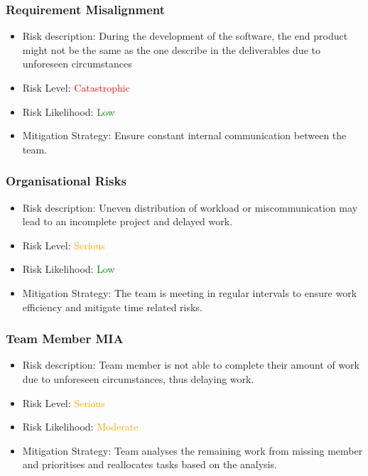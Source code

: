 \documentclass{article}
\begin{document}
\subsubsection{Requirement Misalignment}
\begin{itemize}
    \item Risk description: During the development of the software, the end product might not be the same as the one describe in the deliverables due to unforeseen circumstances
    \item Risk Level: \textcolor{red}{Catastrophic}
    \item Risk Likelihood: \textcolor{green}{Low}
    \item Mitigation Strategy: Ensure constant internal communication between the team.
\end{itemize}

\subsubsection{Organisational Risks}
\begin{itemize}
    \item Risk description: Uneven distribution of workload or miscommunication may lead to an incomplete project and delayed work. 
    \item Risk Level: \textcolor{orange}{Serious}
    \item Risk Likelihood: \textcolor{green}{Low}
    \item Mitigation Strategy: The team is meeting in regular intervals to ensure work efficiency and mitigate time related risks.
\end{itemize}

\subsubsection{Team Member MIA}
\begin{itemize}
    \item Risk description: Team member is not able to complete their amount of work due to unforeseen circumstances, thus delaying work. 
    \item Risk Level: \textcolor{orange}{Serious}
    \item Risk Likelihood: \textcolor{orange}{Moderate}
    \item Mitigation Strategy: Team analyses the remaining work from missing member and prioritises and reallocates tasks based on the analysis. 
\end{itemize}
\end{document}
